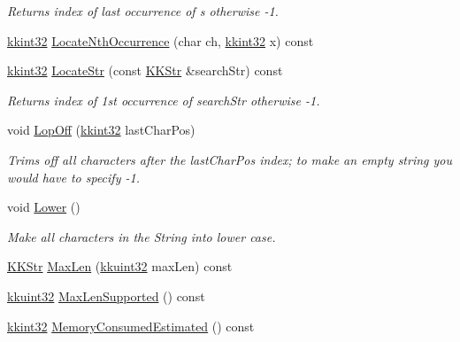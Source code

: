 \begin{DoxyCompactItemize}
\begin{DoxyCompactList}\small\item\em Returns index of last occurrence of \textquotesingle{}s\textquotesingle{} otherwise -\/1. \end{DoxyCompactList}\item 
\hyperlink{namespace_k_k_b_a8fa4952cc84fda1de4bec1fbdd8d5b1b}{kkint32} \hyperlink{class_k_k_b_1_1_k_k_str_a8d9b1fd856ad1f8a31f47eb2e4c8793f}{Locate\+Nth\+Occurrence} (char ch, \hyperlink{namespace_k_k_b_a8fa4952cc84fda1de4bec1fbdd8d5b1b}{kkint32} x) const 
\item 
\hyperlink{namespace_k_k_b_a8fa4952cc84fda1de4bec1fbdd8d5b1b}{kkint32} \hyperlink{class_k_k_b_1_1_k_k_str_ad9c52aa4a0ee175b0d45661e95f4dbc9}{Locate\+Str} (const \hyperlink{class_k_k_b_1_1_k_k_str}{K\+K\+Str} \&search\+Str) const 
\begin{DoxyCompactList}\small\item\em Returns index of 1st occurrence of \textquotesingle{}search\+Str\textquotesingle{} otherwise -\/1. \end{DoxyCompactList}\item 
void \hyperlink{class_k_k_b_1_1_k_k_str_a2e49773afb0e928aa5e0d9de2052ad50}{Lop\+Off} (\hyperlink{namespace_k_k_b_a8fa4952cc84fda1de4bec1fbdd8d5b1b}{kkint32} last\+Char\+Pos)
\begin{DoxyCompactList}\small\item\em Trims off all characters after the \textquotesingle{}last\+Char\+Pos\textquotesingle{} index; to make an empty string you would have to specify -\/1. \end{DoxyCompactList}\item 
void \hyperlink{class_k_k_b_1_1_k_k_str_a296d7245e52cdb976cea6d1c5267e899}{Lower} ()
\begin{DoxyCompactList}\small\item\em Make all characters in the String into lower case. \end{DoxyCompactList}\item 
\hyperlink{class_k_k_b_1_1_k_k_str}{K\+K\+Str} \hyperlink{class_k_k_b_1_1_k_k_str_aad35c53f603d550f3e9d7db1a96e3e6b}{Max\+Len} (\hyperlink{namespace_k_k_b_af8d832f05c54994a1cce25bd5743e19a}{kkuint32} max\+Len) const 
\item 
\hyperlink{namespace_k_k_b_af8d832f05c54994a1cce25bd5743e19a}{kkuint32} \hyperlink{class_k_k_b_1_1_k_k_str_a7056de4de4ea9fee5276b4c9f5a71943}{Max\+Len\+Supported} () const 
\item 
\hyperlink{namespace_k_k_b_a8fa4952cc84fda1de4bec1fbdd8d5b1b}{kkint32} \hyperlink{class_k_k_b_1_1_k_k_str_afc335bf98a8d4a77dc34215e72068719}{Memory\+Consumed\+Estimated} () const 

\end{DoxyCompactItemize}
